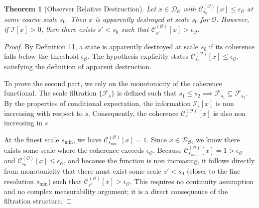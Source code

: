 \documentclass[12pt]{article}
\newtheorem{theorem}{Theorem}
\theoremstyle{definition}
\begin{document}
\begin{theorem}[Observer Relative Destruction]
Let $x \in \mathcal{D}_{\mathcal{O}}$ with $\mathcal{C}_{s_0}^{(\mathcal{O})}[x] \leq \epsilon_{\mathcal{O}}$ at some coarse scale $s_0$. Then $x$ is apparently destroyed at scale $s_0$ for $\mathcal{O}$. However, if $\mathcal{I}[x] > 0$, then there exists $s' < s_0$ such that $\mathcal{C}_{s'}^{(\mathcal{O})}[x] > \epsilon_{\mathcal{O}}$.
\end{theorem}
\begin{proof}
By Definition 11, a state is apparently destroyed at scale $s_0$ if its coherence falls below the threshold $\epsilon_{\mathcal{O}}$. The hypothesis explicitly states $\mathcal{C}_{s_0}^{(\mathcal{O})}[x] \leq \epsilon_{\mathcal{O}}$, satisfying the definition of apparent destruction.

To prove the second part, we rely on the monotonicity of the coherence functional. The scale filtration $\{\mathcal{F}_s\}$ is defined such that $s_1 \leq s_2 \implies \mathcal{F}_{s_1} \subseteq \mathcal{F}_{s_2}$. By the properties of conditional expectation, the information $\mathcal{I}_s[x]$ is non increasing with respect to $s$. Consequently, the coherence $\mathcal{C}_s^{(\mathcal{O})}[x]$ is also non increasing in $s$.

At the finest scale $s_{\min}$, we have $\mathcal{C}_{s_{\min}}^{(\mathcal{O})}[x] = 1$. Since $x \in \mathcal{D}_{\mathcal{O}}$, we know there exists some scale where the coherence exceeds $\epsilon_{\mathcal{O}}$. Because $\mathcal{C}_{s_{\min}}^{(\mathcal{O})}[x] = 1 > \epsilon_{\mathcal{O}}$ and $\mathcal{C}_{s_0}^{(\mathcal{O})}[x] \leq \epsilon_{\mathcal{O}}$, and because the function is non increasing, it follows directly from monotonicity that there must exist some scale $s' < s_0$ (closer to the fine resolution $s_{\min}$) such that $\mathcal{C}_{s'}^{(\mathcal{O})}[x] > \epsilon_{\mathcal{O}}$. This requires no continuity assumption and no complex measurability argument; it is a direct consequence of the filtration structure.
\end{proof}
\end{document}
